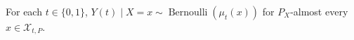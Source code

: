 For each \(t\in\{0,1\}\), \(Y(t)\mid X=x\sim\operatorname{Bernoulli}(\mu_t(x))\) for \(P_X\)-almost every \(x\in\mathcal X_{t,P}\).